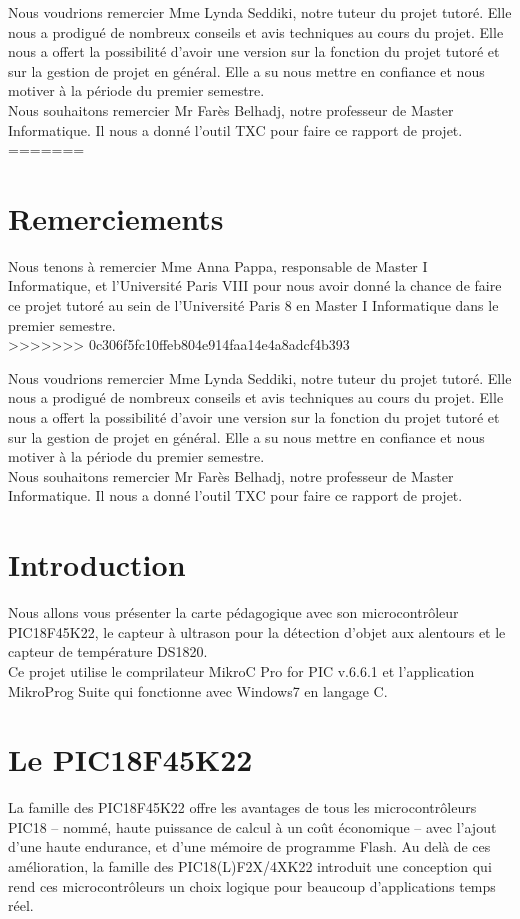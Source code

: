 \documentclass[a4paper, 12pt]{book}
\newcounter{program}[subsection]
\begin{document}
Nous voudrions remercier Mme Lynda Seddiki, notre tuteur du projet tutoré. Elle nous a prodigué de nombreux conseils et avis techniques au cours du projet. Elle nous a offert la possibilité d’avoir une version sur la fonction du projet tutoré et sur la gestion de projet en général. Elle a su nous mettre en confiance et nous motiver à la période du premier semestre.\\

Nous souhaitons remercier Mr Farès Belhadj, notre professeur de Master Informatique. Il nous a donné l’outil TXC pour faire ce rapport de projet.
=======
\chapter*{Remerciements}
Nous tenons à remercier Mme Anna Pappa, responsable de Master I Informatique, et l’Université Paris VIII pour nous avoir donné la chance de faire ce projet tutoré au sein de l’Université Paris 8 en Master I Informatique dans le premier semestre.\\
>>>>>>> 0c306f5fc10ffeb804e914faa14e4a8adcf4b393

Nous voudrions remercier Mme Lynda Seddiki, notre tuteur du projet tutoré. Elle nous a prodigué de nombreux conseils et avis techniques au cours du projet. Elle nous a offert la possibilité d’avoir une version sur la fonction du projet tutoré et sur la gestion de projet en général. Elle a su nous mettre en confiance et nous motiver à la période du premier semestre.\\

Nous souhaitons remercier Mr Farès Belhadj, notre professeur de Master Informatique. Il nous a donné l’outil TXC pour faire ce rapport de projet.


\chapter*{Introduction}
Nous allons vous présenter la carte pédagogique avec son microcontrôleur PIC18F45K22, le capteur à ultrason pour la détection d'objet aux alentours et le capteur de température DS1820.\\

Ce projet utilise le comprilateur MikroC Pro for PIC v.6.6.1 et l'application MikroProg Suite qui fonctionne avec Windows7 en langage C. \\

\chapter{Le PIC18F45K22}
La famille des PIC18F45K22 offre les avantages de tous les microcontrôleurs  PIC18 – nommé, haute puissance de calcul à un coût économique – avec l’ajout d’une haute endurance, et d’une mémoire de programme Flash. Au delà de ces amélioration, la famille des PIC18(L)F2X/4XK22 introduit une conception qui rend ces microcontrôleurs un choix logique pour beaucoup d’applications temps réel.\\
\end{document}
